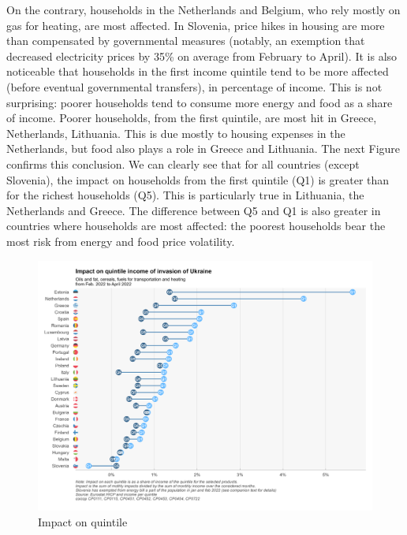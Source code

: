 \documentclass[
  9pt,
  a4paper,
  DIV=11,
  numbers=noendperiod,
  oneside]{scrartcl}
\begin{document}
On the contrary, households in the Netherlands and Belgium, who rely
mostly on gas for heating, are most affected. In Slovenia, price hikes
in housing are more than compensated by governmental measures (notably,
an exemption that decreased electricity prices by 35\% on average from
February to April). It is also noticeable that households in the first
income quintile tend to be more affected (before eventual governmental
transfers), in percentage of income. This is not surprising: poorer
households tend to consume more energy and food as a share of income.
Poorer households, from the first quintile, are most hit in Greece,
Netherlands, Lithuania. This is due mostly to housing expenses in the
Netherlands, but food also plays a role in Greece and Lithuania. The
next Figure confirms this conclusion. We can clearly see that for all
countries (except Slovenia), the impact on households from the first
quintile (Q1) is greater than for the richest households (Q5). This is
particularly true in Lithuania, the Netherlands and Greece. The
difference between Q5 and Q1 is also greater in countries where
households are most affected: the poorest households bear the most risk
from energy and food price volatility.

\begin{figure}

\caption{Impact on quintile}

{\centering \includegraphics[width=16cm,height=\textheight]{../svg/quantiles1et5.png}

}

\end{figure}
\end{document}

